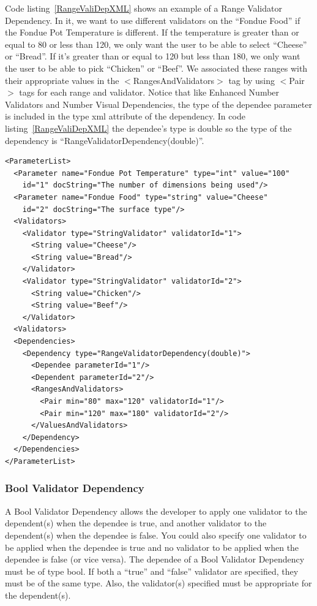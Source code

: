 Code listing~\ref{RangeValiDepXML} shows an example of a Range Validator Dependency. In it, we want to use different validators
on the ``Fondue Food'' if the Fondue Pot Temperature is different. If the temperature is greater than or equal to 80 or less than 120,
we only want the user to be able to select ``Cheese'' or ``Bread''. If it's greater than or equal to 120 but less than 180, we only want the
user to be able to pick ``Chicken'' or ``Beef''. We associated these ranges with their appropriate values in the $<$RangesAndValidators$>$ tag by
using $<$Pair$>$ tags for each range and validator. Notice that like Enhanced Number Validators and Number Visual Dependencies, the type of the dependee parameter is 
included in the type xml attribute of the dependency. In code listing~\ref{RangeValiDepXML} the dependee's type is double so the type of the dependency is 
``RangeValidatorDependency(double)''.
\begin{lstlisting}[caption={Example usage of a Range Validator Dependency}, label=RangeValiDepXML]
<ParameterList>
  <Parameter name="Fondue Pot Temperature" type="int" value="100"
    id="1" docString="The number of dimensions being used"/>
  <Parameter name="Fondue Food" type="string" value="Cheese"
    id="2" docString="The surface type"/>
  <Validators>
    <Validator type="StringValidator" validatorId="1">
      <String value="Cheese"/>
      <String value="Bread"/>
    </Validator>
    <Validator type="StringValidator" validatorId="2">
      <String value="Chicken"/>
      <String value="Beef"/>
    </Validator>
  <Validators>
  <Dependencies>
    <Dependency type="RangeValidatorDependency(double)">
      <Dependee parameterId="1"/>
      <Dependent parameterId="2"/>
      <RangesAndValidators>
        <Pair min="80" max="120" validatorId="1"/>
        <Pair min="120" max="180" validatorId="2"/>
      </ValuesAndValidators>
    </Dependency>
  </Dependencies>
</ParameterList>
\end{lstlisting}

\subsubsection{Bool Validator Dependency}
A Bool Validator Dependency allows the developer to apply one validator to the dependent(s) when the dependee is true, and another validator
to the dependent(s) when the dependee is false. You could also specify one validator to be applied when the dependee is true and no validator
to be applied when the dependee is false (or vice versa). The dependee of a Bool Validator Dependency must be of type bool. If both a ``true'' and
``false'' validator are specified, they must be of the same type. Also, the validator(s) specified must be appropriate for the dependent(s).

